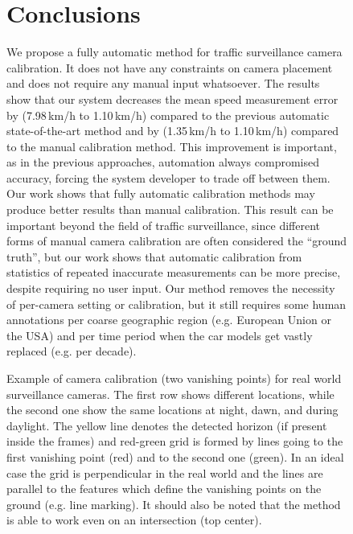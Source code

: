 \documentclass[]{elsarticle}
\begin{document}
\begin{figure}[h]
\begin{figure*}[t]
	\centering
	\caption{Example of camera calibration (two vanishing points) for real world surveillance cameras. The first row shows different locations, while the second one show the same locations at night, dawn, and during daylight. The yellow line denotes the detected horizon (if present inside the frames) and red-green grid is formed by lines going to the first vanishing point (red) and to the second one (green). In an ideal case the grid is perpendicular in the real world and the lines are parallel to the features which define the vanishing points on the ground (e.g. line marking). It should also be noted that the method is able to work even on an intersection (top center). }
	\label{fig:RealWorldCalib}
\end{figure*}

\section{Conclusions}

We propose a fully automatic method for traffic surveillance camera calibration. It does not have any constraints on camera placement and does not require any manual input whatsoever. The results show that our system decreases the mean speed measurement error by  (7.98\,km/h to 1.10\,km/h) compared to the previous automatic state-of-the-art method and by  (1.35\,km/h to 1.10\,km/h) compared to the manual calibration method. This improvement is important, as in the previous approaches, automation always compromised accuracy, forcing the system developer to trade off between them.  Our work shows that fully automatic calibration methods may produce better results than manual calibration. This result can be important beyond the field of traffic surveillance, since different forms of manual camera calibration are often considered the ``ground truth'', but our work shows that automatic calibration from statistics of repeated inaccurate measurements can be more precise, despite requiring no user input.
Our method removes the necessity of per-camera setting or calibration, but it still requires some human annotations per coarse geographic region (e.g. European Union or the USA) and per time period when the car models get vastly replaced (e.g. per decade). 


\end{figure}
\end{document}
